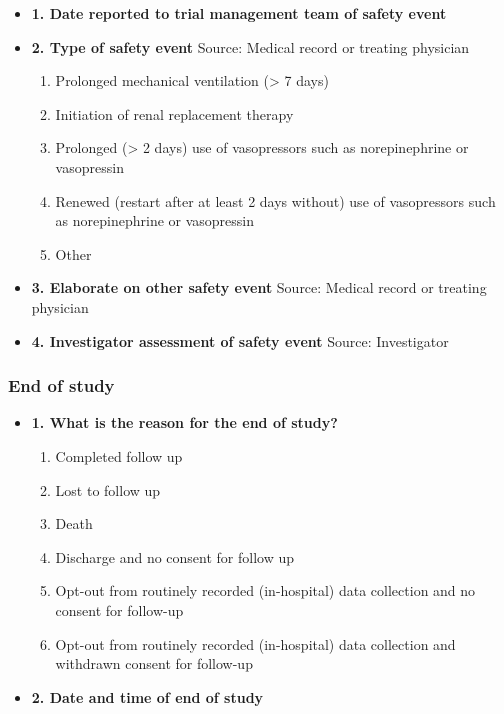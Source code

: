 \documentclass[
]{scrartcl}
\providecommand{\tightlist}{%
  \setlength{\itemsep}{0pt}\setlength{\parskip}{0pt}}\usepackage{longtable,booktabs,array}
\begin{document}
\begin{itemize}
\item
  \textbf{1. Date reported to trial management team of safety event}
\item
  \textbf{2. Type of safety event} Source: Medical record or treating
  physician

  \begin{enumerate}
  \def\labelenumi{\arabic{enumi}.}
  \tightlist
  \item
    Prolonged mechanical ventilation (\textgreater{} 7 days)
  \item
    Initiation of renal replacement therapy
  \item
    Prolonged (\textgreater{} 2 days) use of vasopressors such as
    norepinephrine or vasopressin
  \item
    Renewed (restart after at least 2 days without) use of vasopressors
    such as norepinephrine or vasopressin
  \item
    Other
  \end{enumerate}
\item
  \textbf{3. Elaborate on other safety event} Source: Medical record or
  treating physician
\item
  \textbf{4. Investigator assessment of safety event} Source:
  Investigator
\end{itemize}

\hypertarget{end-of-study}{%
\subsubsection{End of study}\label{end-of-study}}

\begin{itemize}
\tightlist
\item
  \textbf{1. What is the reason for the end of study?}

  \begin{enumerate}
  \def\labelenumi{\arabic{enumi}.}
  \tightlist
  \item
    Completed follow up
  \item
    Lost to follow up
  \item
    Death
  \item
    Discharge and no consent for follow up
  \item
    Opt-out from routinely recorded (in-hospital) data collection and no
    consent for follow-up
  \item
    Opt-out from routinely recorded (in-hospital) data collection and
    withdrawn consent for follow-up
  \end{enumerate}
\item
  \textbf{2. Date and time of end of study}
\end{itemize}
\end{document}
